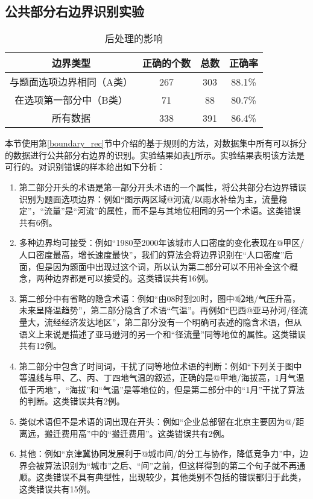 \documentclass[master, winfont]{njuthesis}
\begin{document}
\subsection{公共部分右边界识别实验}
\begin{table}[!htbp]
	\begin{center}
		\begin{tabular}{c|c|c|c}
			\hline {边界类型} & {正确的个数} & {总数} & {正确率}  \\
			\hline 与题面选项边界相同（A类） & 267 & 303 & 88.1\% \\
			\hline 在选项第一部分中（B类） & 71 & 88 & 80.7\% \\
			\hline 所有数据	& 338 & 391 & 86.4\% \\
			\hline
		\end{tabular}
	\end{center}
	\caption{\label{boundary} 后处理的影响}
\end{table}
本节使用第\ref{boundary_rec}节中介绍的基于规则的方法，对数据集中所有可以拆分的数据进行公共部分右边界的识别。实验结果如表\ref{boundary}所示。实验结果表明该方法是可行的。对识别错误的样本给出如下分析：
\begin{enumerate}
	\item 第二部分开头的术语是第一部分开头术语的一个属性，将公共部分右边界错误识别为题面选项边界：例如“图示两区域@河流/以雨水补给为主，流量稳定”，“流量”是“河流”的属性，而不是与其地位相同的另一个术语。这类错误共有6例。
	\item 多种边界均可接受：例如“1980至2000年该城市人口密度的变化表现在@甲区/人口密度最高，增长速度最快”，我们的算法会将边界识别在“人口密度”后面，但是因为题面中出现过这个词，所以认为第二部分可以不用补全这个概念，两种边界都是可以接受的。这类错误共有16例。
	\item 第二部分中有省略的隐含术语：例如“由08时到20时，图中@\textcircled{2}地/气压升高，未来呈降温趋势”，第二部分隐含了术语“气温”。再例如“巴西@亚马孙河/径流量大，流经经济发达地区”，第二部分没有一个明确可表述的隐含术语，但从语义上来说是描述了亚马逊河的另一个和“径流量”同等地位的属性。这类错误共有12例。
	\item 第二部分中包含了时间词，干扰了同等地位术语的判断：例如“下列关于图中等温线与甲、乙、丙、丁四地气温的叙述，正确的是@甲地/海拔高，1月气温低于丙地”，“海拔”和“气温”是等地位的，但是第二部分中的“1月”干扰了算法的判断。这类错误共有2例。
	\item 类似术语但不是术语的词出现在开头：例如“企业总部留在北京主要因为@/距离远，搬迁费用高”中的“搬迁费用”。这类错误共有2例。
	\item 其他：例如“京津冀协同发展利于@城市间/的分工与协作，降低竞争力”中，边界会被算法识别为“城市”之后、“间”之前，但这样得到的第二个句子就不再通顺。这类错误不具有典型性，出现较少，其他类别不包括的错误都归于此类，这类错误共有15例。
\end{enumerate}
\end{document}
